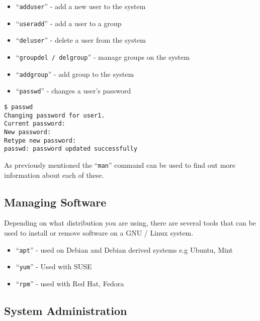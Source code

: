 \documentclass{extbook}
\begin{document}
\begin{itemize}
\item ``\verb|adduser|'' - add a new user to the system
\item ``\verb|useradd|'' - add a user to a group
\item ``\verb|deluser|'' - delete a user from the system
\item ``\verb|groupdel / delgroup|'' - manage groups on the system
\item ``\verb|addgroup|'' - add group to the system
\item ``\verb|passwd|'' - changes a user's password
\end{itemize}

\begin{verbatim}
$ passwd
Changing password for user1.
Current password:
New password:
Retype new password:
passwd: password updated successfully
\end{verbatim}

As previously mentioned the ``\verb|man|'' command can be used to find out more information about each of these.

\subsection{Managing Software}

Depending on what distribution you are using, there are several tools that can be used to install or remove software on a GNU / Linux system.

\begin{itemize}
\item ``\verb|apt|'' - used on Debian and Debian derived systems e.g Ubuntu, Mint
\item ``\verb|yum|'' - Used with SUSE
\item ``\verb|rpm|'' - used with Red Hat, Fedora
\end{itemize}

\subsection{System Administration}
\end{document}
